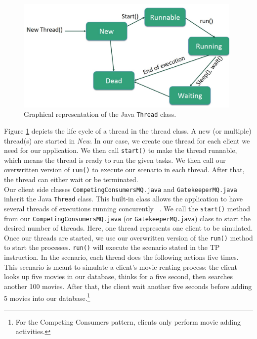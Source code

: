 \documentclass{article}
\begin{document}
\begin{figure}[t]
	\centering
	\includegraphics[width = 11cm]{images/threadSchema.jpg}
	\caption{Graphical representation of the Java \texttt{Thread} class.}
	\label{fig:Thread Schema}
\end{figure}


Figure \ref{fig:Thread Schema} depicts the life cycle of a thread in the thread class. A new (or multiple) thread(s) are started in \textit{New}. In our case, we create one thread for each client we need for our application. We then call \texttt{start()} to make the thread runnable, which means the thread is ready to run the given tasks. We then call our overwritten version of \texttt{run()} to execute our scenario in each thread. After that, the thread can either wait or be terminated.  \\ 

Our client side classes \texttt{CompetingConsumersMQ.java} and  \texttt{GatekeeperMQ.java} inherit the Java \texttt{Thread} class. This built-in class allows the application to have several threads of executions running concurently ~\cite{threads_java}. We call the \texttt{start()} method from our \texttt{CompetingConsumersMQ.java} (or \texttt{GatekeeperMQ.java}) class to start the desired number of threads. Here, one thread represents one client to be simulated. Once our threads are started, we use our overwritten version of the \texttt{run()} method to start the processes. \texttt{run()} will execute the scenario stated in the TP instruction. In the scenario, each thread does the following actions five times. \\

This scenario is meant to simulate a client's movie renting process: the client looks up five movies in our database, thinks for a five second, then searches another 100 movies. After that, the client wait another five seconds before adding 5 movies into our database.\footnote{For the Competing Consumers pattern, clients only perform movie adding activities.}
\end{document}
